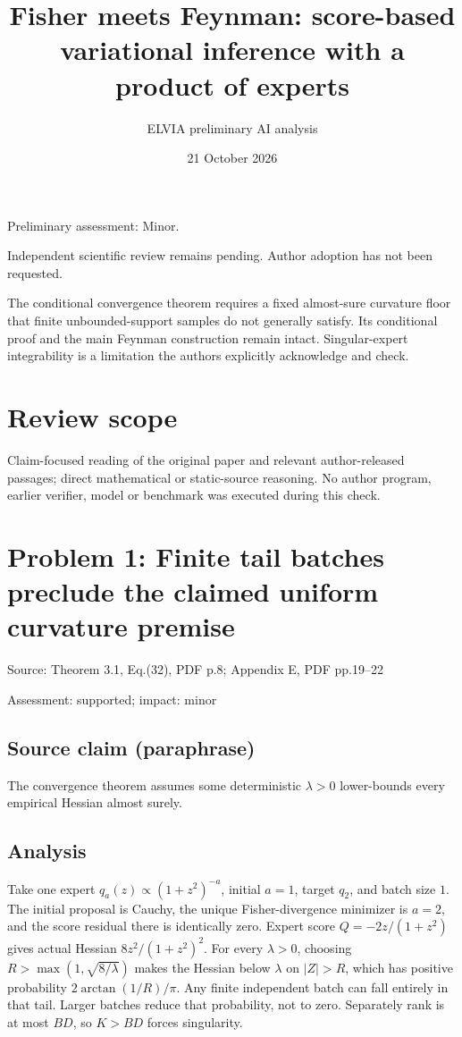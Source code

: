 \documentclass[11pt]{article}
\begin{document}
\title{Fisher meets Feynman: score-based variational inference with a product of experts}

\author{ELVIA preliminary AI analysis}\date{21 October 2026}\maketitle

Preliminary assessment: Minor.\par

Independent scientific review remains pending. Author adoption has not been requested.

The conditional convergence theorem requires a fixed almost-sure curvature floor that finite unbounded-support samples do not generally satisfy. Its conditional proof and the main Feynman construction remain intact. Singular-expert integrability is a limitation the authors explicitly acknowledge and check.

\section*{Review scope}

Claim-focused reading of the original paper and relevant author-released passages; direct mathematical or static-source reasoning. No author program, earlier verifier, model or benchmark was executed during this check.

\section*{Problem 1: Finite tail batches preclude the claimed uniform curvature premise}

Source: Theorem 3.1, Eq.(32), PDF p.8; Appendix E, PDF pp.19–22

Assessment: supported; impact: minor

\subsection*{Source claim (paraphrase)}

The convergence theorem assumes some deterministic \(\lambda>0\) lower-bounds every empirical Hessian almost surely.

\subsection*{Analysis}

Take one expert \(q_a(z)\propto(1+z^2)^{-a}\), initial \(a=1\), target \(q_2\), and batch size \(1\). The initial proposal is Cauchy, the unique Fisher-divergence minimizer is \(a=2\), and the score residual there is identically zero. Expert score \(Q=-2z/(1+z^2)\) gives actual Hessian \(8z^2/(1+z^2)^2\). For every \(\lambda>0\), choosing \(R>\max(1,\sqrt{8/\lambda})\) makes the Hessian below \(\lambda\) on \(|Z|>R\), which has positive probability \(2\arctan(1/R)/\pi\). Any finite independent batch can fall entirely in that tail. Larger batches reduce that probability, not to zero. Separately rank is at most \(BD\), so \(K>BD\) forces singularity.
\end{document}
